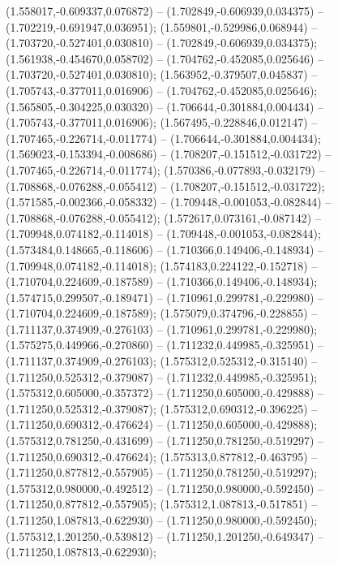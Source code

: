  (1.558017,-0.609337,0.076872) -- (1.702849,-0.606939,0.034375) -- (1.702219,-0.691947,0.036951);
 (1.559801,-0.529986,0.068944) -- (1.703720,-0.527401,0.030810) -- (1.702849,-0.606939,0.034375);
 (1.561938,-0.454670,0.058702) -- (1.704762,-0.452085,0.025646) -- (1.703720,-0.527401,0.030810);
 (1.563952,-0.379507,0.045837) -- (1.705743,-0.377011,0.016906) -- (1.704762,-0.452085,0.025646);
 (1.565805,-0.304225,0.030320) -- (1.706644,-0.301884,0.004434) -- (1.705743,-0.377011,0.016906);
 (1.567495,-0.228846,0.012147) -- (1.707465,-0.226714,-0.011774) -- (1.706644,-0.301884,0.004434);
 (1.569023,-0.153394,-0.008686) -- (1.708207,-0.151512,-0.031722) -- (1.707465,-0.226714,-0.011774);
 (1.570386,-0.077893,-0.032179) -- (1.708868,-0.076288,-0.055412) -- (1.708207,-0.151512,-0.031722);
 (1.571585,-0.002366,-0.058332) -- (1.709448,-0.001053,-0.082844) -- (1.708868,-0.076288,-0.055412);
 (1.572617,0.073161,-0.087142) -- (1.709948,0.074182,-0.114018) -- (1.709448,-0.001053,-0.082844);
 (1.573484,0.148665,-0.118606) -- (1.710366,0.149406,-0.148934) -- (1.709948,0.074182,-0.114018);
 (1.574183,0.224122,-0.152718) -- (1.710704,0.224609,-0.187589) -- (1.710366,0.149406,-0.148934);
 (1.574715,0.299507,-0.189471) -- (1.710961,0.299781,-0.229980) -- (1.710704,0.224609,-0.187589);
 (1.575079,0.374796,-0.228855) -- (1.711137,0.374909,-0.276103) -- (1.710961,0.299781,-0.229980);
 (1.575275,0.449966,-0.270860) -- (1.711232,0.449985,-0.325951) -- (1.711137,0.374909,-0.276103);
 (1.575312,0.525312,-0.315140) -- (1.711250,0.525312,-0.379087) -- (1.711232,0.449985,-0.325951);
 (1.575312,0.605000,-0.357372) -- (1.711250,0.605000,-0.429888) -- (1.711250,0.525312,-0.379087);
 (1.575312,0.690312,-0.396225) -- (1.711250,0.690312,-0.476624) -- (1.711250,0.605000,-0.429888);
 (1.575312,0.781250,-0.431699) -- (1.711250,0.781250,-0.519297) -- (1.711250,0.690312,-0.476624);
 (1.575313,0.877812,-0.463795) -- (1.711250,0.877812,-0.557905) -- (1.711250,0.781250,-0.519297);
 (1.575312,0.980000,-0.492512) -- (1.711250,0.980000,-0.592450) -- (1.711250,0.877812,-0.557905);
 (1.575312,1.087813,-0.517851) -- (1.711250,1.087813,-0.622930) -- (1.711250,0.980000,-0.592450);
 (1.575312,1.201250,-0.539812) -- (1.711250,1.201250,-0.649347) -- (1.711250,1.087813,-0.622930);
